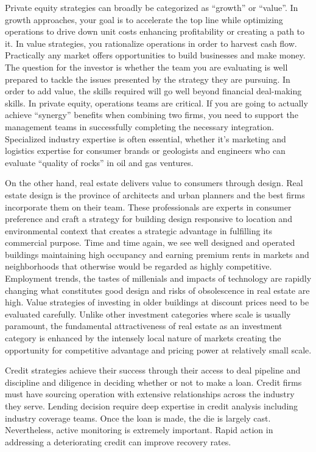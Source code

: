 \documentclass[12pt,english]{article}\usepackage[]{graphicx}\usepackage[]{color}
\begin{document}
Private equity strategies can broadly be categorized as ``growth''
or ``value''. In growth approaches, your goal is to accelerate the
top line while optimizing operations to drive down unit costs enhancing
profitability or creating a path to it. In value strategies, you rationalize
operations in order to harvest cash flow. Practically any market offers
opportunities to build businesses and make money. The question for
the investor is whether the team you are evaluating is well prepared
to tackle the issues presented by the strategy they are pursuing.
In order to add value, the skills required will go well beyond financial
deal-making skills. In private equity, operations teams are critical.
If you are going to actually achieve ``synergy'' benefits when combining
two firms, you need to support the management teams in successfully
completing the necessary integration. Specialized industry expertise
is often essential, whether it's marketing and logistics expertise
for consumer brands or geologists and engineers who can evaluate ``quality
of rocks'' in oil and gas ventures. 

On the other hand, real estate delivers value to consumers through
design. Real estate design is the province of architects and urban
planners and the best firms incorporate them on their team. These
professionals are experts in consumer preference and craft a strategy
for building design responsive to location and environmental context
that creates a strategic advantage in fulfilling its commercial purpose.
Time and time again, we see well designed and operated buildings maintaining
high occupancy and earning premium rents in markets and neighborhoods
that otherwise would be regarded as highly competitive. Employment
trends, the tastes of millenials and impacts of technology are rapidly
changing what constitutes good design and risks of obsolescence in
real estate are high. Value strategies of investing in older buildings
at discount prices need to be evaluated carefully. Unlike other investment
categories where scale is usually paramount, the fundamental attractiveness
of real estate as an investment category is enhanced by the intensely
local nature of markets creating the opportunity for competitive advantage
and pricing power at relatively small scale. 

Credit strategies achieve their success through their access to deal
pipeline and discipline and diligence in deciding whether or not to
make a loan. Credit firms must have sourcing operation with extensive
relationships across the industry they serve. Lending decision require
deep expertise in credit analysis including industry coverage teams.
Once the loan is made, the die is largely cast. Nevertheless, active
monitoring is extremely important. Rapid action in addressing a deteriorating
credit can improve recovery rates. 
\end{document}
